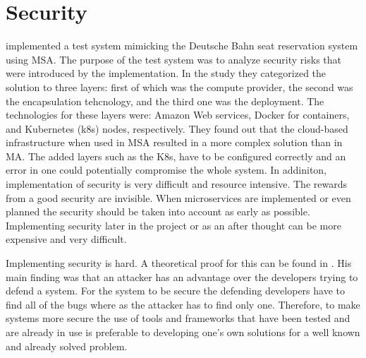 

\section{Security}
\begin{sloppypar}
    \citet{closer18} implemented a test system mimicking the Deutsche Bahn seat
    reservation system using MSA. The purpose of the test system was to analyze
    security risks that were introduced by the implementation. In the study they
    categorized the solution to three layers: first of which was the compute
    provider, the second was the encapsulation tehcnology, and the third one was
    the deployment. The technologies for these layers were: Amazon Web services,
    Docker for containers, and Kubernetes (k8s) nodes, respectively. They found
    out that the cloud-based infrastructure when used in MSA resulted in a more
    complex solution than in MA. The added layers such as the K8s, have to be
    configured correctly and an error in one could potentially compromise the
    whole system. In addiniton, implementation of security is very difficult and
    resource intensive. The rewards from a good security are invisible. When
    microservices are implemented or even planned the security should be taken
    into account as early as possible. Implementing security later in the
    project or as an after thought can be more expensive and very difficult.
\end{sloppypar}
\begin{sloppypar}
    Implementing security is hard. A theoretical proof for this can be found in
    \citet{andersson2001information}. His main finding was that an attacker has
    an advantage over the developers trying to defend a system. For the system
    to be secure the defending developers have to find all of the bugs where as
    the attacker has to find only one. Therefore, to make systems more secure
    the use of tools and frameworks that have been tested and are already in use
    is preferable to developing one's own solutions for a well known and already
    solved problem.
\end{sloppypar}




